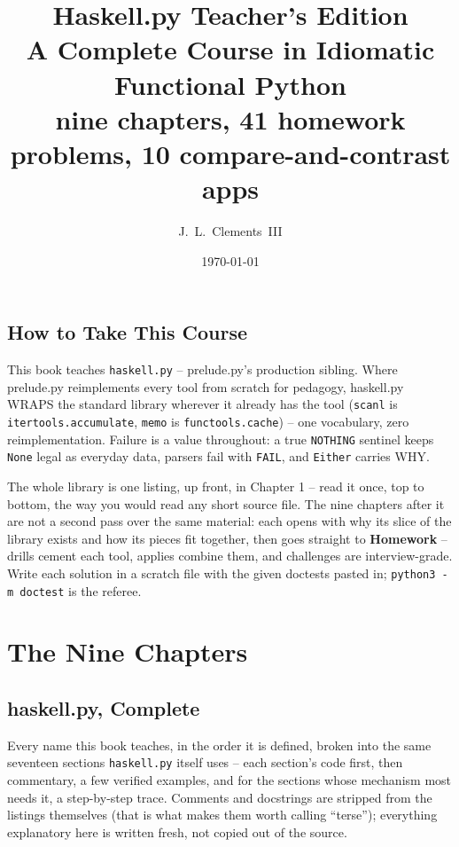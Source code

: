 \documentclass[10pt,letterpaper]{book}
\title{\Huge\bfseries Haskell.py Teacher's Edition\\[6pt]\Large A Complete Course in Idiomatic Functional Python\\[14pt]\normalsize nine chapters, 41 homework problems, 10 compare-and-contrast apps}
\author{J.~L.~Clements~III}
\date{\today}
\begin{document}
\frontmatter
\maketitle

\chapter{How to Take This Course}
This book teaches \texttt{haskell.py} -- prelude.py's production sibling.
Where prelude.py reimplements every tool from scratch for pedagogy,
haskell.py WRAPS the standard library wherever it already has the tool
(\texttt{scanl} is \texttt{itertools.accumulate}, \texttt{memo} is
\texttt{functools.cache}) -- one vocabulary, zero reimplementation. Failure
is a value throughout: a true \texttt{NOTHING} sentinel keeps \texttt{None}
legal as everyday data, parsers fail with \texttt{FAIL}, and \texttt{Either}
carries WHY.

The whole library is one listing, up front, in Chapter 1 -- read it once,
top to bottom, the way you would read any short source file. The nine
chapters after it are not a second pass over the same material: each opens
with why its slice of the library exists and how its pieces fit together,
then goes straight to \textbf{Homework} -- drills cement each tool, applies
combine them, and challenges are interview-grade. Write each solution in a
scratch file with the given doctests pasted in; \texttt{python3 -m doctest}
is the referee.

\tableofcontents
\mainmatter
\part{The Nine Chapters}
\chapter{haskell.py, Complete}
Every name this book teaches, in the order it is defined, broken into the same seventeen sections
\texttt{haskell.py} itself uses -- each section's code first, then commentary, a few verified
examples, and for the sections whose mechanism most needs it, a step-by-step trace. Comments and
docstrings are stripped from the listings themselves (that is what makes them worth calling
``terse''); everything explanatory here is written fresh, not copied out of the source.
\end{document}
